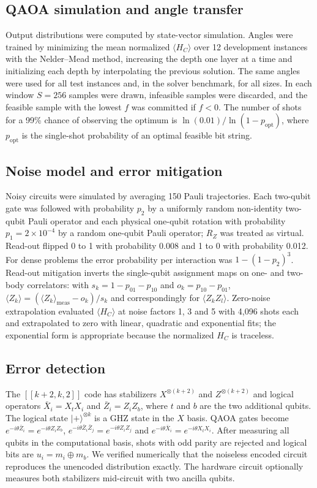 \subsection*{QAOA simulation and angle transfer}
Output distributions were computed by state-vector simulation. Angles were trained by minimizing the mean normalized $\langle H_{C}\rangle$ over 12 development instances with the Nelder--Mead method, increasing the depth one layer at a time and initializing each depth by interpolating the previous solution\cite{zhou2020}. The same angles were used for all test instances and, in the solver benchmark, for all sizes. In each window $S=256$ samples were drawn, infeasible samples were discarded, and the feasible sample with the lowest $f$ was committed if $f<0$. The number of shots for a 99\% chance of observing the optimum is $\ln(0.01)/\ln(1-p_{\mathrm{opt}})$, where $p_{\mathrm{opt}}$ is the single-shot probability of an optimal feasible bit string.

\subsection*{Noise model and error mitigation}
Noisy circuits were simulated by averaging 150 Pauli trajectories. Each two-qubit gate was followed with probability $p_{2}$ by a uniformly random non-identity two-qubit Pauli operator and each physical one-qubit rotation with probability $p_{1}=2\times10^{-4}$ by a random one-qubit Pauli operator; $R_{Z}$ was treated as virtual. Read-out flipped 0 to 1 with probability 0.008 and 1 to 0 with probability 0.012. For dense problems the error probability per interaction was $1-(1-p_{2})^{3}$. Read-out mitigation inverts the single-qubit assignment maps on one- and two-body correlators: with $s_{k}=1-p_{01}-p_{10}$ and $o_{k}=p_{10}-p_{01}$, $\langle Z_{k}\rangle=(\langle Z_{k}\rangle_{\mathrm{meas}}-o_{k})/s_{k}$ and correspondingly for $\langle Z_{k}Z_{l}\rangle$. Zero-noise extrapolation evaluated $\langle H_{C}\rangle$ at noise factors 1, 3 and 5 with 4,096 shots each and extrapolated to zero with linear, quadratic and exponential fits; the exponential form is appropriate because the normalized $H_{C}$ is traceless.

\subsection*{Error detection}
The $[[k+2,k,2]]$ code has stabilizers $X^{\otimes(k+2)}$ and $Z^{\otimes(k+2)}$ and logical operators $\bar X_{i}=X_{t}X_{i}$ and $\bar Z_{i}=Z_{i}Z_{b}$, where $t$ and $b$ are the two additional qubits\cite{self2024}. The logical state $\lvert+\rangle^{\otimes k}$ is a GHZ state in the $X$ basis. QAOA gates become $e^{-i\theta\bar Z_{i}}=e^{-i\theta Z_{i}Z_{b}}$, $e^{-i\theta\bar Z_{i}\bar Z_{j}}=e^{-i\theta Z_{i}Z_{j}}$ and $e^{-i\theta\bar X_{i}}=e^{-i\theta X_{t}X_{i}}$\cite{he2024}. After measuring all qubits in the computational basis, shots with odd parity are rejected and logical bits are $u_{i}=m_{i}\oplus m_{b}$. We verified numerically that the noiseless encoded circuit reproduces the unencoded distribution exactly. The hardware circuit optionally measures both stabilizers mid-circuit with two ancilla qubits.

